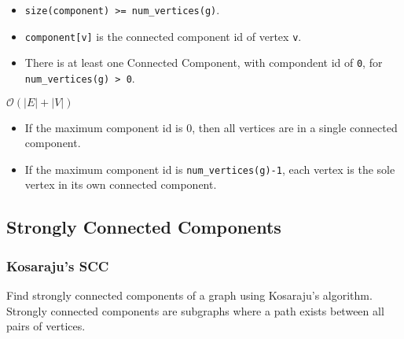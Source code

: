 {\small
     
}


\begin{itemdescr}
      \pnum\preconditions
            \begin{itemize}
                  \item
                        \lstinline{size(component) >= num_vertices(g)}.
            \end{itemize}
      \pnum\effects
            \begin{itemize}
                  \item
                        \lstinline{component[v]} is the connected component id of vertex \lstinline{v}.
                  \item
                        There is at least one Connected Component, with compondent id of \lstinline{0}, for \lstinline{num_vertices(g) > 0}.
            \end{itemize}
      \pnum\complexity $\mathcal{O}(|E|+|V|)$ \\
      \pnum\remarks 
            \begin{itemize}
                  \item
                        If the maximum component id is 0, then all vertices are in a single connected component.
                  \item
                        If the maximum component id is \lstinline{num_vertices(g)-1}, each vertex is the sole vertex in its 
                        own connected component.
            \end{itemize}
\end{itemdescr}

\subsection{Strongly Connected Components}
\subsubsection{Kosaraju's SCC}
Find strongly connected components of a graph using Kosaraju's algorithm. Strongly connected components are subgraphs where a path exists between all pairs of vertices.

